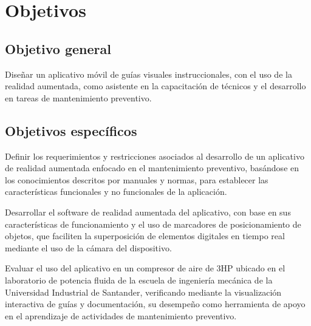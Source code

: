 \section{Objetivos}

    \subsection{Objetivo general}

        Diseñar un aplicativo móvil de guías visuales instruccionales, con el uso de la realidad aumentada, como asistente en la capacitación de técnicos y el desarrollo en tareas de mantenimiento preventivo.

    \subsection{Objetivos específicos}

        Definir los requerimientos y restricciones asociados al desarrollo de un aplicativo de realidad aumentada enfocado en el mantenimiento preventivo, basándose en los conocimientos descritos por manuales y normas, para establecer las características funcionales y no funcionales de la aplicación.

        Desarrollar el software de realidad aumentada del aplicativo, con base en sus características de funcionamiento y el uso de marcadores de posicionamiento de objetos, que faciliten la superposición de elementos digitales en tiempo real mediante el uso de la cámara del dispositivo.

        Evaluar el uso del aplicativo en un compresor de aire de 3HP ubicado en el laboratorio de potencia fluida de la escuela de ingeniería mecánica de la Universidad Industrial de Santander, verificando mediante la visualización interactiva de guías y documentación, su desempeño como herramienta de apoyo en el aprendizaje de actividades de mantenimiento preventivo.
